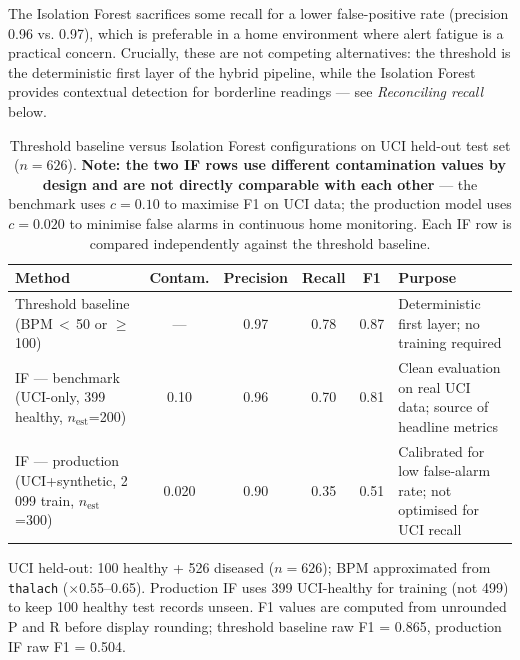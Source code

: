 The Isolation Forest sacrifices some recall for a lower false-positive rate (precision 0.96 vs. 0.97), which is preferable in a home environment where alert fatigue is a practical concern. Crucially, these are not competing alternatives: the threshold is the deterministic first layer of the hybrid pipeline, while the Isolation Forest provides contextual detection for borderline readings --- see \emph{Reconciling recall} below.

\begin{table}[H]
\centering
\caption[Threshold baseline vs.\ Isolation Forest configurations]{Threshold baseline versus Isolation Forest configurations on UCI held-out test set ($n=626$). \textbf{Note: the two IF rows use different contamination values by design and are not directly comparable with each other} --- the benchmark uses $c=0.10$ to maximise F1 on UCI data; the production model uses $c=0.020$ to minimise false alarms in continuous home monitoring. Each IF row is compared independently against the threshold baseline.}
\label{tab:feature_ablation}
\small
\setlength{\tabcolsep}{5pt}
\begin{tabularx}{\textwidth}{@{} >{\RaggedRight\arraybackslash}X c c c c >{\RaggedRight\arraybackslash}X @{}}
\toprule
\textbf{Method} & \textbf{Contam.} & \textbf{Precision} & \textbf{Recall} & \textbf{F1} & \textbf{Purpose} \\
\midrule
Threshold baseline (BPM\,$<$\,50 or $\geq$\,100) & --- & 0.97 & 0.78 & 0.87 & Deterministic first layer; no training required \\
IF --- benchmark (UCI-only, 399 healthy, $n_\text{est}$=200) & 0.10 & 0.96 & 0.70 & 0.81 & Clean evaluation on real UCI data; source of headline metrics \\
IF --- production (UCI+synthetic, 2\,099 train, $n_\text{est}$=300) & 0.020 & 0.90 & 0.35 & 0.51 & Calibrated for low false-alarm rate; not optimised for UCI recall \\
\bottomrule
\end{tabularx}

\vspace{2pt}
{\footnotesize\RaggedRight\noindent
UCI held-out: 100 healthy + 526 diseased ($n=626$); BPM approximated from \texttt{thalach} ($\times$0.55--0.65).
Production IF uses 399 UCI-healthy for training (not 499) to keep 100 healthy test records unseen.
F1 values are computed from unrounded P and R before display rounding; threshold baseline raw F1 = 0.865, production IF raw F1 = 0.504.\par}
\end{table}

